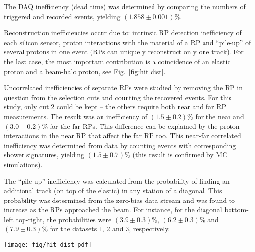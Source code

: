 \documentclass[doublecol]{epl/epl2}
\def\un#1{\,{\rm #1}}
\begin{document}
The DAQ inefficiency (dead time) was determined by comparing the numbers of triggered and recorded events, yielding $(1.858 \pm 0.001)\%$.

Reconstruction inefficiencies occur due to: intrinsic RP detection inefficiency of each silicon sensor, proton interactions with the material of a RP and ``pile-up'' of several protons in one event (RPs can uniquely reconstruct only one track). For the last case, the most important contribution is a coincidence of an elastic proton and a beam-halo proton, see Fig.~\ref{fig:hit dist}.

Uncorrelated inefficiencies of separate RPs were studied by removing the RP in question from the selection cuts and counting the recovered events. For this study, only cut 2 could be kept -- the others require both near and far RP measurements. The result was an inefficiency of $(1.5 \pm 0.2)\%$ for the near and $(3.0 \pm 0.2)\%$ for the far RPs. This difference can be explained by the proton interactions in the near RP that affect the far RP too. This near-far correlated inefficiency was determined from data by counting events with corresponding shower signatures, yielding $(1.5\pm 0.7)\%$ (this result is confirmed by MC simulations).

The ``pile-up'' inefficiency was calculated from the probability of finding an additional track (on top of the elastic) in any station of a diagonal. This probability was determined from the zero-bias data stream and was found to increase as the RPs approached the beam. For instance, for the diagonal bottom-left top-right, the probabilities were $(3.9 \pm 0.3)\%$, $(6.2 \pm 0.3)\%$ and $(7.9 \pm 0.3)\%$ for the datasets 1, 2 and 3, respectively.


\begin{figure*}
\hbox{}\vskip-7mm
\begin{center}
\texttt{[image: fig/hit\_dist.pdf]}
\vskip-5mm
\caption{Hit distributions from dataset 3 in the far unit of the $220\un{m}$ station, right arm. Left: with diagonal cut only, Right: with all the elastic selection cuts (see Tab.~\ref{tab:cuts}). The left plot clearly shows the presence of a beam halo, which is eliminated by the selection cuts (the right plot). The distribution of elastic hits in the right plot is sharply cut at about $|y| = 29\un{mm}$ as a consequence of the LHC aperture limitations. }
\label{fig:hit dist}
\end{center}
\end{figure*}

\end{document}
